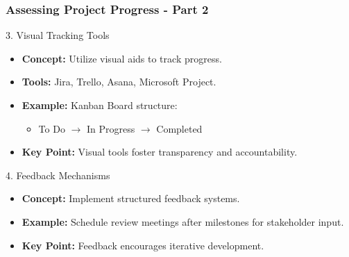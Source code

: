 \documentclass[aspectratio=169]{beamer}
\begin{document}
\begin{frame}[fragile]
    \frametitle{Assessing Project Progress - Part 2}
    \begin{block}{3. Visual Tracking Tools}
        \begin{itemize}
            \item \textbf{Concept:} Utilize visual aids to track progress.
            \item \textbf{Tools:} Jira, Trello, Asana, Microsoft Project.
            \item \textbf{Example:} Kanban Board structure:
            \begin{itemize}
                \item To Do $\rightarrow$ In Progress $\rightarrow$ Completed
            \end{itemize}
            \item \textbf{Key Point:} Visual tools foster transparency and accountability.
        \end{itemize}
    \end{block}

    \begin{block}{4. Feedback Mechanisms}
        \begin{itemize}
            \item \textbf{Concept:} Implement structured feedback systems.
            \item \textbf{Example:} Schedule review meetings after milestones for stakeholder input.
            \item \textbf{Key Point:} Feedback encourages iterative development.
        \end{itemize}
    \end{block}
\end{frame}
\end{document}

